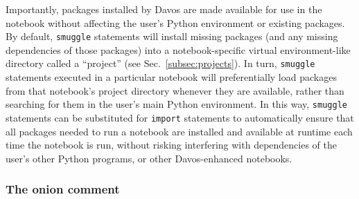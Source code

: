 \documentclass[preprint,12pt,a4paper]{elsarticle}
\begin{document}
Importantly, packages installed by Davos are made available for use in the
notebook without affecting the user's Python environment or existing packages.
By default, \texttt{smuggle} statements will install missing packages (and any
missing dependencies of those packages) into a notebook-specific virtual
environment-like directory called a ``project'' (see
Sec.~\ref{subsec:projects}). In turn, \texttt{smuggle} statements executed in a
particular notebook will preferentially load packages from that notebook's
project directory whenever they are available, rather than searching for them
in the user's main Python environment. In this way, \texttt{smuggle}
statements can be substituted for \texttt{import} statements to automatically
ensure that all packages needed to run a notebook are installed and available
at runtime each time the notebook is run, without risking interfering with
dependencies of the user's other Python programs, or other Davos-enhanced
notebooks.


\subsubsection{The onion comment}\label{subsec:onion}
\end{document}
